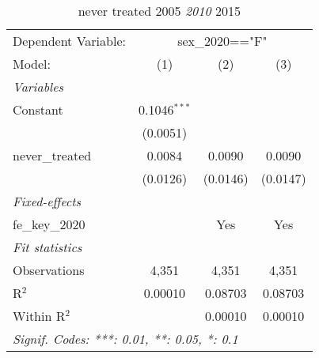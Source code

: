 
\begin{table}[htbp]
   \caption{never treated 2005 \textit{ 2010 } 2015}
   \centering
   \begin{tabular}{lccc}
      \tabularnewline \midrule \midrule
      Dependent Variable: & \multicolumn{3}{c}{sex\_2020=="F"}\\
      Model:          & (1)            & (2)      & (3)\\  
      \midrule
      \emph{Variables}\\
      Constant        & 0.1046$^{***}$ &          &   \\   
                      & (0.0051)       &          &   \\   
      never\_treated  & 0.0084         & 0.0090   & 0.0090\\   
                      & (0.0126)       & (0.0146) & (0.0147)\\   
      \midrule
      \emph{Fixed-effects}\\
      fe\_key\_2020   &                & Yes      & Yes\\  
      \midrule
      \emph{Fit statistics}\\
      Observations    & 4,351          & 4,351    & 4,351\\  
      R$^2$           & 0.00010        & 0.08703  & 0.08703\\  
      Within R$^2$    &                & 0.00010  & 0.00010\\  
      \midrule \midrule
      \multicolumn{4}{l}{\emph{Signif. Codes: ***: 0.01, **: 0.05, *: 0.1}}\\
   \end{tabular}
\end{table}


